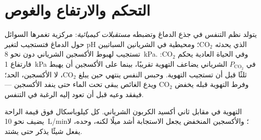 \section{التحكم والارتفاع والغوص}

\begin{proposition}\label{prop:b1:gas-exchange:control}
يتولد نظم التنفس في جذع الدماغ وتضبطه \emph{مستقبلات كيميائية}:
مركزية تغمرها السوائل حول الدماغ فتستجيب لتغير pH الذي يحدثه
$\mathrm{CO_2}$؛ ومحيطية في الشريانين السباتيين تستجيب لهبوط
الأكسجين الشرياني دون نحو \qty{8}{kPa}. وفي الحياة العادية يحكم
$\mathrm{CO_2}$: فارتفاع \qty{1}{kPa} في
$P_{\mathrm{CO_2}}$ الشرياني يضاعف التهوية تقريبًا، بينما على
الأكسجين أن يهبط ثلثًا قبل أن تستجيب التهوية. وحبس النفس ينتهي حين
يبلغ $\mathrm{CO_2}$، لا الأكسجين، الحد؛ وفرط التهوية قبله يخفض
$\mathrm{CO_2}$ ويدع الغائص يبقى تحت الماء حتى ينفد الأكسجين ---
فيفقد وعيه قبل أن تعود إليه الرغبة في التنفس.
\end{proposition}

\begin{omfigure}

{\small التهوية في مقابل ثاني أكسيد الكربون الشرياني. كل كيلوباسكال
فوق قيمة الراحة يضيف نحو \qty{10}{L/min}؛ والأكسجين المنخفض يجعل
الاستجابة أشد ميلًا لكنه، وحده، لا يفعل شيئًا يذكر حتى يشتد.}
\end{omfigure}

